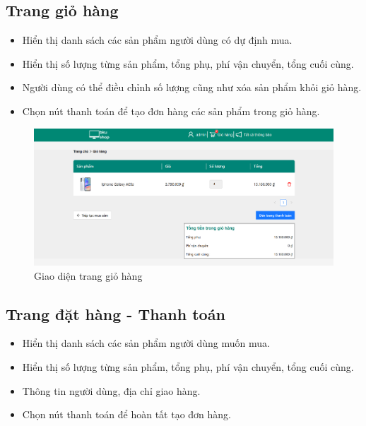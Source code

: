\subsection{Trang giỏ hàng}
\begin{itemize}
    \item Hiển thị danh sách các sản phẩm người dùng có dự định mua.
    \item Hiển thị số lượng từng sản phẩm, tổng phụ, phí vận chuyển, tổng cuối cùng.
    \item Người dùng có thể điều chỉnh số lượng cũng như xóa sản phẩm khỏi giỏ hàng.
    \item Chọn nút thanh toán để tạo đơn hàng các sản phẩm trong giỏ hàng.
\end{itemize}

\begin{figure}[H]
    \begin{center}
    \includegraphics[scale=0.4]{images/hieu/chap-5/cart.png}
    \vspace*{3mm}
    \caption{Giao diện trang giỏ hàng}
    \end{center}
\end{figure}
\subsection{Trang đặt hàng - Thanh toán}
\begin{itemize}
    \item Hiển thị danh sách các sản phẩm người dùng muốn mua.
    \item Hiển thị số lượng từng sản phẩm, tổng phụ, phí vận chuyển, tổng cuối cùng.
    \item Thông tin người dùng, địa chỉ giao hàng.
    \item Chọn nút thanh toán để hoàn tất tạo đơn hàng.
\end{itemize}

